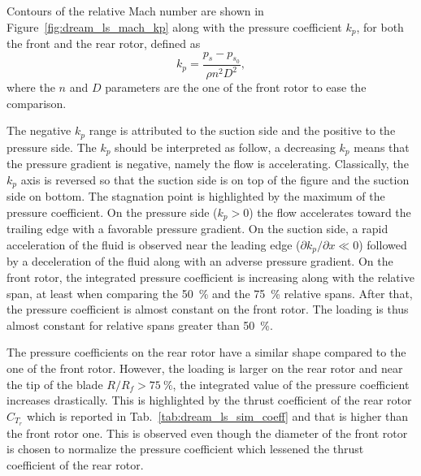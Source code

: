 Contours of the relative Mach number are shown in 
Figure~\ref{fig:dream_ls_mach_kp} along with the pressure coefficient $k_p$,
for both the front and the rear rotor, defined as
\begin{equation}
   k_p = \frac{p_s - p_{s_0}}{\rho n^2 D^2},
\end{equation}
where the $n$ and $D$ parameters are the one of the front rotor
to ease the comparison.

The negative $k_p$ range is attributed
to the suction side and the positive to the pressure side.
The $k_p$ should be interpreted as follow, a decreasing $k_p$
means that the pressure gradient is negative, namely the flow
is accelerating.
Classically, the $k_p$ axis is reversed so that the suction side
is on top of the figure and the suction side on bottom.
The stagnation point is highlighted
by the maximum of the pressure coefficient. On the pressure side 
($k_p > 0$) the flow accelerates
toward the trailing edge with a favorable pressure gradient. 
On the suction side, a rapid acceleration of the fluid
is observed near the leading edge 
($\partial k_p / \partial x \ll 0$) followed by
a deceleration of the fluid along with an
adverse pressure gradient.
On the front rotor, the integrated pressure coefficient is
increasing along with the relative span, at least 
when comparing the 50~\% and the 75~\% relative spans.
After that, the pressure coefficient is almost constant on 
the front rotor. The loading is thus almost constant for
relative spans greater than 50~\%. 

The pressure coefficients on the rear rotor have a similar shape
compared to the one of the front rotor. However, the loading is
larger on the rear rotor and near the tip of the blade
$R/R_f > 75~\%$, the integrated value of the pressure coefficient
increases drastically. This is highlighted by the thrust coefficient 
of the rear rotor $C_{T_r}$ which is reported in 
Tab.~\ref{tab:dream_ls_sim_coeff} and that is higher than
the front rotor one. This is observed even though the diameter of the front
rotor is chosen to normalize the pressure coefficient which
lessened the thrust coefficient of the rear rotor.

